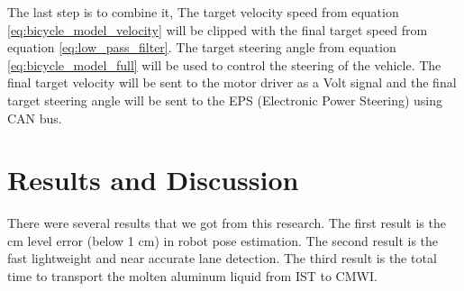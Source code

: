 \documentclass[conference]{IEEEtran}
\begin{document}
\par    
The last step is to combine it, The target velocity speed from equation \ref{eq:bicycle_model_velocity} will be clipped with the final target speed from equation \ref{eq:low_pass_filter}. The target steering angle from equation \ref{eq:bicycle_model_full} will be used to control the steering of the vehicle. The final target velocity will be sent to the motor driver as a Volt signal and the final target steering angle will be sent to the EPS (Electronic Power Steering) using CAN bus.


\section{Results and Discussion} 
There were several results that we got from this research. The first result is the cm level error (below 1 cm) in robot pose estimation. The second result is the fast lightweight and near accurate lane detection. The third result is the total time to transport the molten aluminum liquid from IST to CMWI. 
\end{document}
